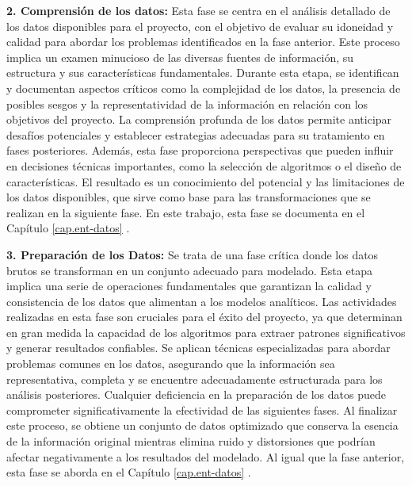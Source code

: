 \textbf{2. Comprensión de los datos:} Esta fase se centra en el análisis detallado de los datos disponibles para el proyecto, con el objetivo de evaluar su idoneidad y calidad para abordar los problemas identificados en la fase anterior. Este proceso implica un examen minucioso de las diversas fuentes de información, su estructura y sus características fundamentales. Durante esta etapa, se identifican y documentan aspectos críticos como la complejidad de los datos, la presencia de posibles sesgos y la representatividad de la información en relación con los objetivos del proyecto. La comprensión profunda de los datos permite anticipar desafíos potenciales y establecer estrategias adecuadas para su tratamiento en fases posteriores. Además, esta fase proporciona perspectivas que pueden influir en decisiones técnicas importantes, como la selección de algoritmos o el diseño de características. El resultado es un conocimiento del potencial y las limitaciones de los datos disponibles, que sirve como base para las transformaciones que se realizan en la siguiente fase. En este trabajo, esta fase se documenta en el Capítulo \ref{cap.ent-datos} .

\textbf{3. Preparación de los Datos:} Se trata de una fase crítica donde los datos brutos se transforman en un conjunto adecuado para modelado. Esta etapa implica una serie de operaciones fundamentales que garantizan la calidad y consistencia de los datos que alimentan a los modelos analíticos. Las actividades realizadas en esta fase son cruciales para el éxito del proyecto, ya que determinan en gran medida la capacidad de los algoritmos para extraer patrones significativos y generar resultados confiables. Se aplican técnicas especializadas para abordar problemas comunes en los datos, asegurando que la información sea representativa, completa y se encuentre adecuadamente estructurada para los análisis posteriores. Cualquier deficiencia en la preparación de los datos puede comprometer significativamente la efectividad de las siguientes fases. Al finalizar este proceso, se obtiene un conjunto de datos optimizado que conserva la esencia de la información original mientras elimina ruido y distorsiones que podrían afectar negativamente a los resultados del modelado. Al igual que la fase anterior, esta fase se aborda en el Capítulo \ref{cap.ent-datos} .


